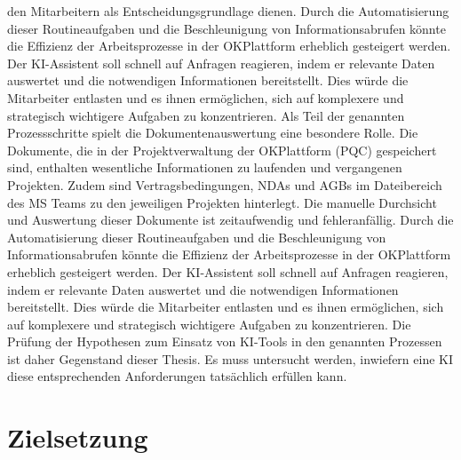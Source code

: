 den Mitarbeitern als Entscheidungsgrundlage dienen. Durch die Automatisierung dieser 
Routineaufgaben und die Beschleunigung von Informationsabrufen könnte die Effizienz der 
Arbeitsprozesse in der OKPlattform erheblich gesteigert werden. Der KI-Assistent soll schnell auf 
Anfragen reagieren, indem er relevante Daten auswertet und die notwendigen Informationen 
bereitstellt. Dies würde die Mitarbeiter entlasten und es ihnen ermöglichen, sich auf komplexere und 
strategisch wichtigere Aufgaben zu konzentrieren.
Als Teil der genannten Prozessschritte spielt die Dokumentenauswertung eine besondere Rolle. Die 
Dokumente, die in der Projektverwaltung der OKPlattform (\ac{PQC}) gespeichert sind, enthalten 
wesentliche Informationen zu laufenden und vergangenen Projekten. Zudem sind 
Vertragsbedingungen, NDAs und AGBs im Dateibereich des MS Teams zu den jeweiligen Projekten 
hinterlegt. Die manuelle Durchsicht und Auswertung dieser Dokumente ist zeitaufwendig und 
fehleranfällig. Durch die Automatisierung dieser Routineaufgaben und die Beschleunigung von 
Informationsabrufen könnte die Effizienz der Arbeitsprozesse in der OKPlattform erheblich gesteigert 
werden. Der \ac{KI}-Assistent soll schnell auf Anfragen reagieren, indem er relevante Daten auswertet und 
die notwendigen Informationen bereitstellt. Dies würde die Mitarbeiter entlasten und es ihnen 
ermöglichen, sich auf komplexere und strategisch wichtigere Aufgaben zu konzentrieren.
Die Prüfung der Hypothesen zum Einsatz von KI-Tools in den genannten Prozessen ist daher Gegenstand 
dieser Thesis. Es muss untersucht werden, inwiefern eine KI diese entsprechenden Anforderungen 
tatsächlich erfüllen kann.

\section{Zielsetzung}

